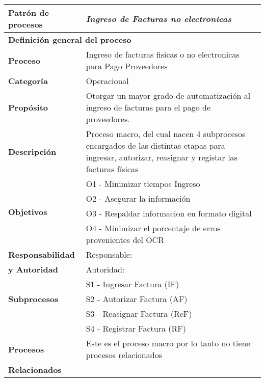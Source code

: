 \begin{longtable}{|llrrrrrr|}
	\hline
	\multicolumn{2}{|l|}{\textbf{Patrón de procesos}} & \multicolumn{6}{|l|}{\textit{Ingreso de Facturas no electronicas}} \\ \hline
	\multicolumn{8}{|l|}{\textbf{Definición general del proceso}} \\ \hline
	\textbf{Proceso} & \multicolumn{7}{|m{12cm}|}{Ingreso de facturas fisicas o no electronicas para Pago Proveedores} \\ \hline
	\textbf{Categoría} & \multicolumn{7}{|m{12cm}|}{Operacional} \\ \hline
	\textbf{Propósito} & \multicolumn{7}{|m{12cm}|}{Otorgar un mayor grado de automatización al ingreso de facturas para el pago de proveedores.} \\ \hline
    \textbf{Descripción} & \multicolumn{7}{|m{12cm}|}{Proceso macro, del cual nacen 4 subprocesos encargados de las distintas etapas para ingresar, autorizar, reasignar y registar las facturas físicas} \\ \hline
	\multirow{4}[6]{*}{\textbf{Objetivos}} 
		  & \multicolumn{7}{|l|}{O1 - Minimizar tiempos Ingreso} \\ \cline{2-8}
          & \multicolumn{7}{|l|}{O2 - Asegurar la información} \\ \cline{2-8}
          & \multicolumn{7}{|l|}{O3 - Respaldar informacion en formato digital} \\ \hline
          & \multicolumn{7}{|l|}{O4 - Minimizar el porcentaje de erros provenientes del OCR} \\ \hline
    \multicolumn{1}{|l|}{\textbf{Responsabilidad}} 	& \multicolumn{7}{|l|}{Responsable: } \\
	\multicolumn{1}{|l|}{\textbf{y Autoridad}} 	& \multicolumn{7}{|l|}{Autoridad: } \\ \hline
	\multirow{3}[4]{*}{\textbf{Subprocesos}} 
		  & \multicolumn{7}{|l|}{S1 - Ingresar Factura (IF)} \\  \cline{2-8} 
	      & \multicolumn{7}{|l|}{S2 - Autorizar Factura (AF)} \\  \cline{2-8} 
	      & \multicolumn{7}{|l|}{S3 - Reasignar Factura (ReF)} \\ \cline{2-8}
	      & \multicolumn{7}{|l|}{S4 - Registrar Factura (RF)} \\ \hline
    \multicolumn{1}{|l|}{\textbf{Procesos}} 	& \multicolumn{7}{|l|}{Este es el proceso macro por lo tanto no tiene procesos relacionados} \\
	\multicolumn{1}{|l|}{\textbf{Relacionados}} 	&  \multicolumn{7}{|l|}{} \\ \hline

\end{longtable}
